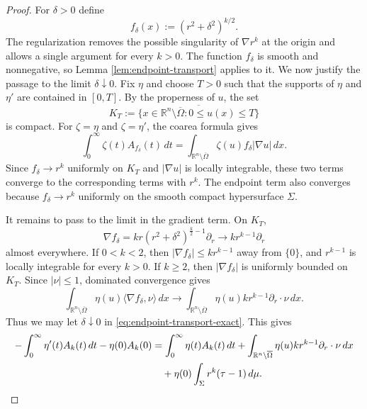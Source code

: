 \documentclass[11pt,reqno]{amsart}
\numberwithin{equation}{section}
\theoremstyle{definition}
\newcommand{\R}{\mathbb R}
\newcommand{\Om}{\Omega}
\newcommand{\Sig}{\Sigma}
\begin{document}
\begin{proof}
For $\delta>0$ define
\begin{equation*}
    f_\delta(x):=(r^2+\delta^2)^{k/2}.
\end{equation*}
The regularization removes the possible singularity of $\nabla r^k$ at the origin and allows a single argument for every $k>0$.  The function $f_\delta$ is smooth and nonnegative, so Lemma \ref{lem:endpoint-transport} applies to it.  We now justify the passage to the limit $\delta\downarrow0$.  Fix $\eta$ and choose $T>0$ such that the supports of $\eta$ and $\eta'$ are contained in $[0,T]$.  By the properness of $u$, the set
\begin{equation*}
    K_T:=\overline{\{x\in\R^n\setminus\overline\Om:0\leq u(x)\leq T\}}
\end{equation*}
is compact.  For $\zeta=\eta$ and $\zeta=\eta'$, the coarea formula gives
\begin{equation*}
    \int_0^\infty \zeta(t)A_{f_\delta}(t)\,dt
    =\int_{\R^n\setminus\overline\Om}
      \zeta(u)f_\delta|\nabla u|\,dx.
\end{equation*}
Since $f_\delta\to r^k$ uniformly on $K_T$ and $|\nabla u|$ is locally integrable, these two terms converge to the corresponding terms with $r^k$.  The endpoint term also converges because $f_\delta\to r^k$ uniformly on the smooth compact hypersurface $\Sig$.

It remains to pass to the limit in the gradient term.  On $K_T$,
\begin{equation*}
    \nabla f_\delta
    =kr(r^2+\delta^2)^{\frac{k}{2}-1}\partial_r
    \longrightarrow kr^{k-1}\partial_r
\end{equation*}
almost everywhere.  If $0<k<2$, then $|\nabla f_\delta|\leq kr^{k-1}$ away from $\{0\}$, and $r^{k-1}$ is locally integrable for every $k>0$.  If $k\geq2$, then $|\nabla f_\delta|$ is uniformly bounded on $K_T$.  Since $|\nu|\leq1$, dominated convergence gives
\begin{equation*}
    \int_{\R^n\setminus\overline\Om}
      \eta(u)\langle\nabla f_\delta,\nu\rangle\,dx
    \longrightarrow
    \int_{\R^n\setminus\overline\Om}
      \eta(u)kr^{k-1}\partial_r\cdot\nu\,dx.
\end{equation*}
Thus we may let $\delta\downarrow0$ in \eqref{eq:endpoint-transport-exact}. This gives
\begin{align}
    -\int_0^\infty\eta'(t)A_k(t)\,dt-\eta(0)A_k(0)
    &=\int_0^\infty\eta(t)A_k(t)\,dt 
      +\int_{\R^n\setminus\overline\Om}
       \eta(u)kr^{k-1}\partial_r\cdot\nu\,dx \notag\\
    &\quad+\eta(0)\int_\Sig r^k(\tau-1)\,d\mu.\label{eq:Ak-endpoint}
\end{align}


\end{proof}
\end{document}
